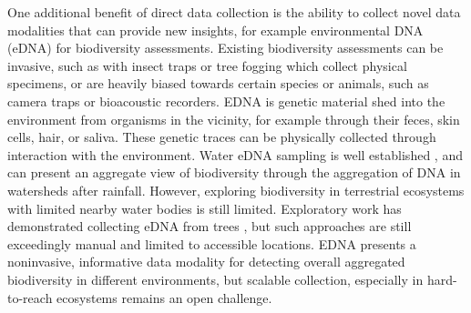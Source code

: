One additional benefit of direct data collection is the ability to collect novel data modalities that can provide new insights, for example environmental DNA (eDNA) for biodiversity assessments. Existing biodiversity assessments can be invasive, such as with insect traps or tree fogging which collect physical specimens, or are heavily biased towards certain species or animals, such as camera traps or bioacoustic recorders. EDNA is genetic material shed into the environment from organisms in the vicinity, for example through their feces, skin cells, hair, or saliva. These genetic traces can be physically collected through interaction with the environment.  Water eDNA sampling is well established \cite{}, and can present an aggregate view of biodiversity through the aggregation of DNA in watersheds after rainfall. 
However, exploring biodiversity in terrestrial ecosystems with limited nearby water bodies is still limited. Exploratory work has demonstrated collecting eDNA from trees \cite{}, but such approaches are still exceedingly manual and limited to accessible locations. EDNA presents a noninvasive, informative data modality for detecting overall aggregated biodiversity in different environments, but scalable collection, especially in hard-to-reach ecosystems remains an open challenge.



